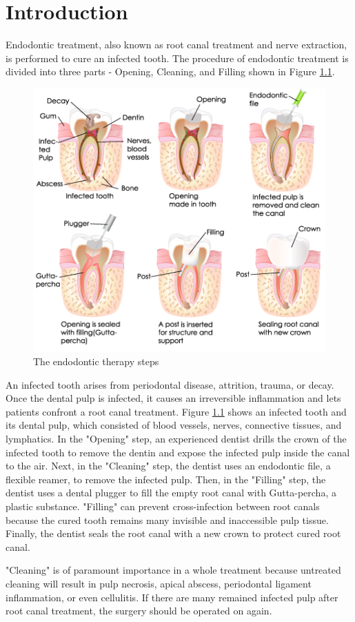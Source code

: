 \chapter{Introduction}
\hspace*{6mm}Endodontic treatment, also known as root canal treatment and nerve extraction, is performed to cure an infected tooth. The procedure of endodontic treatment is divided into three parts - Opening, Cleaning, and Filling shown in  Figure \ref{fig:endo-procedure}.
\begin{figure}[htbp]
\begin{center}
\includegraphics[width=0.8\linewidth]{Images/endo-procedure.png}
\caption{
The endodontic therapy steps
}\label{fig:endo-procedure}
\end{center}
\end{figure}
\newpage
An infected tooth arises from periodontal disease, attrition, trauma, or decay. Once the dental pulp is infected, it causes an irreversible inflammation and lets patients confront a root canal treatment. Figure \ref{fig:endo-procedure} shows an infected tooth and its dental pulp, which consisted of blood vessels, nerves, connective tissues, and lymphatics. In the "Opening" step, an experienced dentist drills the crown of the infected tooth to remove the dentin and expose the infected pulp inside the canal to the air. Next, in the "Cleaning" step, the dentist uses an endodontic file, a flexible reamer, to remove the infected pulp. Then, in the "Filling" step, the dentist uses a dental plugger to fill the empty root canal with Gutta-percha, a plastic substance. "Filling" can prevent cross-infection between root canals because the cured tooth remains many invisible and inaccessible pulp tissue. Finally, the dentist seals the root canal with a new crown to protect cured root canal. 
\par
"Cleaning" is of paramount importance in a whole treatment because untreated cleaning will result in pulp necrosis, apical abscess, periodontal ligament inflammation, or even cellulitis. If there are many remained infected pulp after root canal treatment, the surgery should be operated on again.
